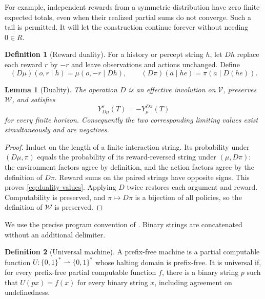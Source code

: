 \documentclass[11pt]{article}
\newtheorem{lemma}[theorem]{Lemma}
\theoremstyle{definition}
\newtheorem{definition}{Definition}
\theoremstyle{remark}
\newcommand{\V}{\mathcal V}
\newcommand{\W}{\mathcal W}
\begin{document}
For example, independent rewards from a symmetric distribution have
zero finite expected totals, even when their realized partial sums do
not converge.  Such a tail is permitted.  It will let the construction
continue forever without needing $0\in R$.

\begin{definition}[Reward duality]
\label{def:duality}
For a history or percept string $h$, let $Dh$ replace each reward $r$
by $-r$ and leave observations and actions unchanged.  Define
\[
  (D\mu)(o,r\mid h)=\mu(o,-r\mid Dh),
  \qquad
  (D\pi)(a\mid he)=\pi(a\mid D(he)).
\]
\end{definition}

\begin{lemma}[Duality]
\label{lem:duality}
The operation $D$ is an effective involution on $\V$, preserves $\W$,
and satisfies
\begin{equation}
  Y_{D\mu}^{\pi}(T)=-Y_\mu^{D\pi}(T)
  \label{eq:duality-values}
\end{equation}
for every finite horizon.  Consequently the two corresponding limiting
values exist simultaneously and are negatives.
\end{lemma}

\begin{proof}
Induct on the length of a finite interaction string.  Its probability
under $(D\mu,\pi)$ equals the probability of its reward-reversed string
under $(\mu,D\pi)$: the environment factors agree by definition, and
the action factors agree by the definition of $D\pi$.  Reward sums on
the paired strings have opposite signs.  This proves
\eqref{eq:duality-values}.  Applying $D$ twice restores each argument
and reward.  Computability is preserved, and $\pi\mapsto D\pi$ is a
bijection of all policies, so the definition of $\W$ is preserved.
\end{proof}

We use the precise program convention of
\cite[Definitions~8--10]{AlexanderHutter2021}.  Binary strings are
concatenated without an additional delimiter.

\begin{definition}[Universal machine]
\label{def:universal}
A prefix-free machine is a partial computable function
$U:\{0,1\}^*\rightharpoonup\{0,1\}^*$ whose halting domain is
prefix-free.  It is universal if, for every prefix-free partial
computable function $f$, there is a binary string $p$ such that
$U(px)=f(x)$ for every binary string $x$, including agreement on
undefinedness.
\end{definition}
\end{document}
